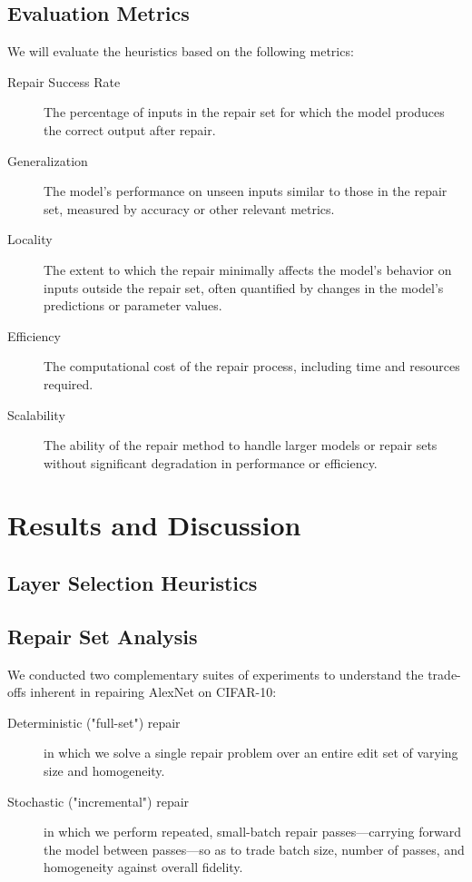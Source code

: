 \documentclass{article}
\begin{document}
\subsection{Evaluation Metrics}
We will evaluate the heuristics based on the following metrics:
\begin{description}
	\item[Repair Success Rate] The percentage of inputs in the repair set for which the model produces the correct output after repair.
	\item[Generalization] The model's performance on unseen inputs similar to those in the repair set, measured by accuracy or other relevant metrics.
	\item[Locality] The extent to which the repair minimally affects the model's behavior on inputs outside the repair set, often quantified by changes in the model's predictions or parameter values.
	\item[Efficiency] The computational cost of the repair process, including time and resources required.
	\item[Scalability] The ability of the repair method to handle larger models or repair sets without significant degradation in performance or efficiency.
\end{description}

\section{Results and Discussion}

\subsection{Layer Selection Heuristics}

\subsection{Repair Set Analysis}
We conducted two complementary suites of experiments to understand the trade-offs inherent in repairing AlexNet on CIFAR-10:

\begin{description}
	\item[Deterministic ("full-set") repair]in which we solve a single repair problem over an entire edit set of varying size and homogeneity.
	\item[Stochastic ("incremental") repair]in which we perform repeated, small-batch repair passes—carrying forward the model between passes—so as to trade batch size, number of passes, and homogeneity against overall fidelity.
\end{description}
\end{document}
